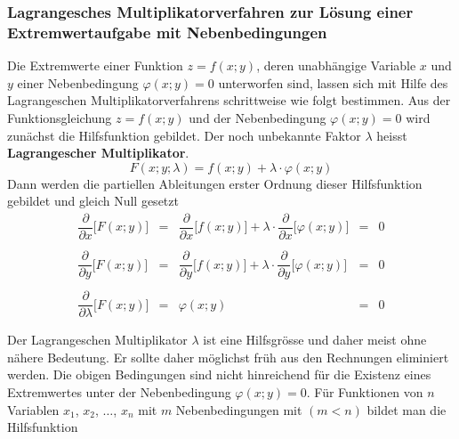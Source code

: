 \subsubsection{Lagrangesches Multiplikatorverfahren zur Lösung einer Extremwertaufgabe mit Nebenbedingungen}
Die Extremwerte einer Funktion $z=f\left(x; y\right)$, deren unabhängige Variable $x$ und $y$ einer Nebenbedingung $\varphi\left(x; y\right)=0$ unterworfen sind, lassen sich mit Hilfe des Lagrangeschen Multiplikatorverfahrens schrittweise wie folgt bestimmen.
\newline \newline
Aus der Funktionsgleichung $z=f\left(x; y\right)$ und der Nebenbedingung $\varphi\left(x; y\right)=0$ wird zunächst die Hilfsfunktion gebildet. Der noch unbekannte Faktor $\lambda$ heisst \textbf{Lagrangescher Multiplikator}.
\begin{equation} 
\boxed{F\left(x; y; \lambda\right)=f\left(x; y\right)+\lambda\cdot \varphi\left(x; y\right)}
\end{equation} 
Dann werden die partiellen Ableitungen erster Ordnung dieser Hilfsfunktion gebildet und gleich Null gesetzt
\begin{equation}
\boxed{
\begin{array}{lllll}
\dfrac{\partial}{\partial x}\Big[F\left(x; y\right)\Big]&=&\dfrac{\partial}{\partial x}\Big[f\left(x; y\right)\Big]+\lambda\cdot \dfrac{\partial}{\partial x}\Big[\varphi\left(x; y\right)\Big]&=&0\\\\
\dfrac{\partial}{\partial y}\Big[F\left(x; y\right)\Big]&=&\dfrac{\partial}{\partial y}\Big[f\left(x; y\right)\Big]+\lambda\cdot \dfrac{\partial}{\partial y}\Big[\varphi\left(x; y\right)\Big]&=&0\\\\
\dfrac{\partial}{\partial \lambda}\Big[F\left(x; y\right)\Big]&=&\varphi\left(x; y\right)&=&0\\\\
\end{array}
}
\end{equation}
Der Lagrangeschen Multiplikator $\lambda$ ist eine Hilfsgrösse und daher meist ohne nähere Bedeutung. Er sollte daher möglichst früh aus den Rechnungen eliminiert werden. Die obigen Bedingungen sind nicht hinreichend für die Existenz eines Extremwertes unter der Nebenbedingung $\varphi\left(x; y\right)=0$.
\newline\newline
Für Funktionen von $n$ Variablen $x_1$, $x_2$, $\dotso$, $x_n$ mit $m$ Nebenbedingungen mit $\left(m<n\right)$ bildet man die Hilfsfunktion
